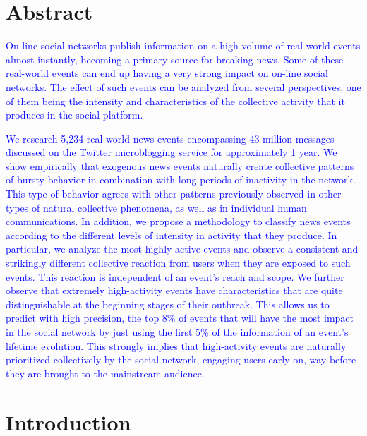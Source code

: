 \documentclass[10pt,letterpaper]{article}
\begin{document}
\section*{Abstract}

\textcolor{blue}{On-line social networks publish information on a high volume of
real-world events almost instantly, becoming a primary source for
breaking news.  Some of these real-world events can end up
having a very strong impact on on-line social networks.  The effect of such
events can be analyzed from several perspectives, one of them being
the intensity and characteristics of the collective activity that it
produces in the social platform.}

\textcolor{blue}{We research 5,234 real-world news events encompassing 43 million
messages discussed on the Twitter microblogging service for
approximately 1 year.  We show empirically that exogenous news events
naturally create
collective patterns of bursty behavior in combination with long periods of
inactivity in the network. This type of behavior agrees with
other patterns previously observed in other types of natural collective phenomena, as
well as in individual human communications. In addition, we propose a methodology to
classify news events according to the different levels of intensity in
activity that they produce. In particular, we analyze the most
highly active events and 
observe a consistent and strikingly different collective reaction
from users when they are exposed to such events.  This reaction is
independent of an event's reach and scope.  We further observe that
extremely high-activity events have characteristics that are quite distinguishable
at the beginning stages of their outbreak.  This allows us to predict
with high precision, the top 8\% of events that will have the most
impact in the social network by just using the first 5\% of the information of an
event's lifetime evolution. This strongly implies that high-activity events
are naturally prioritized collectively by the social network, engaging users early
on, way before they are brought to the mainstream audience.}

\linenumbers

\section*{Introduction}
\end{document}

